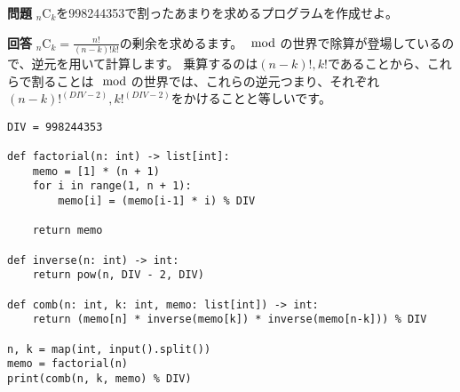 \documentclass{jlreq}
\begin{document}
  \begin{tcolorbox}[enhanced,
    colback=white!85!gray,
    drop fuzzy shadow,
    boxrule=0.3mm,
    arc=0mm,
    left=0pt,
    top=0pt,
    sharp corners,
    width=\textwidth,
    ]
    \textbf{問題}
    ${}_n \mathrm{C}_k$を998244353で割ったあまりを求めるプログラムを作成せよ。
  \tcblower

  \begin{tcolorbox}[
    coltext=white!10!blue,
    colback=white!90!purple!90!blue,
    drop fuzzy shadow,
    boxrule=0mm,
    arc=0mm,
    width=1.3cm,
    left=0pt,
    right=0pt,
    top=0pt,
    bottom=0pt,
    halign=flush left,
  ]
  \end{tcolorbox}
  \tcblower
  \textbf{回答} 
  ${}_n \mathrm{C}_k = \frac{n!}{(n - k)! k!}$の剰余を求めるます。$\mod$の世界で除算が登場しているので、逆元を用いて計算します。
  乗算するのは$(n - k)!, k!$であることから、これらで割ることは$\mod$の世界では、これらの逆元つまり、それぞれ$(n - k)!^{(DIV-2)}, k!^{(DIV-2)}$をかけることと等しいです。
  \begin{lstlisting}[caption=${}_n \mathrm{C}_k$を求める, label=combination]
DIV = 998244353

def factorial(n: int) -> list[int]:
    memo = [1] * (n + 1)
    for i in range(1, n + 1):
        memo[i] = (memo[i-1] * i) % DIV
    
    return memo

def inverse(n: int) -> int:
    return pow(n, DIV - 2, DIV)

def comb(n: int, k: int, memo: list[int]) -> int:
    return (memo[n] * inverse(memo[k]) * inverse(memo[n-k])) % DIV
 
n, k = map(int, input().split())
memo = factorial(n)
print(comb(n, k, memo) % DIV)
  \end{lstlisting}
  \end{tcolorbox}%
\end{document}

